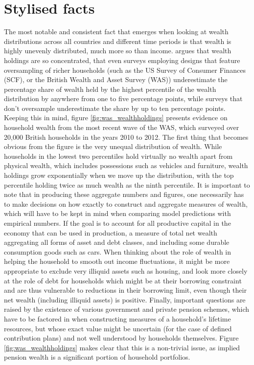 \section{Stylised facts}
The most notable and consistent fact that emerges when looking at wealth
distributions across all countries and different time periods is that wealth
is highly unevenly distributed, much more so than income. \citet{Vermeulen2014}
argues that wealth holdings are so concentrated, that even surveys employing 
designs that feature oversampling of richer households (such as the US Survey of
Consumer Finances (SCF), or the British Wealth and Asset Survey (WAS)) 
underestimate the percentage share of wealth held by the highest percentile of the
wealth distribution by anywhere from one to five percentage points, while surveys
that don't oversample underestimate the share by up to ten percentage points.
Keeping this in mind, figure \ref{fig:was_wealthholdings} presents evidence on 
household wealth from the most recent wave of the WAS, which surveyed over 
20,000 British households in the years 2010 to 2012. The first thing that becomes
obvious from the figure is the very unequal distribution of wealth. While households
in the lowest two percentiles hold virtually no wealth apart from physical 
wealth, which includes possessions such as vehicles and furniture, wealth holdings
grow exponentially when we move up the distribution, with the top percentile 
holding twice as much wealth as the ninth percentile. It is important to note
that in producing these aggregate numbers and figures, one necessarily has
to make decisions on how exactly to construct and aggregate measures of wealth,
which will have to be kept in mind when comparing model predictions with
empirical numbers. If the goal is to account for all productive capital in the 
economy that can be used in production, a measure of total net wealth aggregating 
all forms of asset and debt classes, and including some durable consumption 
goods such as cars. When thinking about the role of wealth in helping the 
household to smooth out
income fluctuations, it might be more appropriate to exclude very illiquid
assets such as housing, and look more closely at the role of debt for households
which might be at their borrowing constraint and are thus vulnerable to
reductions in their borrowing limit, even though their net wealth (including
illiquid assets) is positive. Finally, important questions are raised by
the existence of various government and private pension schemes, which have
to be factored in when constructing measures of a household's lifetime
resources, but whose exact value might be uncertain (for the case of defined
contribution plans) and not well understood by households themselves. Figure
\ref{fig:was_wealthholdings} makes clear that this is a non-trivial issue, as
implied pension wealth is a significant portion of household portfolios.

